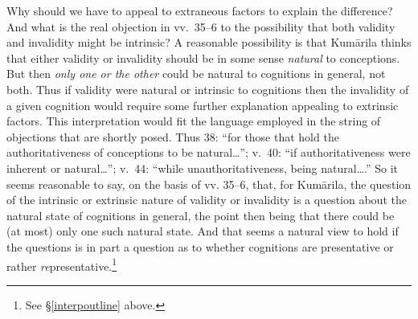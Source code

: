 ﻿\documentclass[11pt]{amsart}
\begin{document}
Why should we have to appeal to extraneous factors to explain the difference? And what is the real objection in vv.~35--6 to the possibility that both validity and invalidity might be intrinsic? A reasonable possibility is that Kum\=arila thinks that either validity or invalidity should be in some sense \emph{natural} to conceptions. But then \emph{only one or the other} could be natural to cognitions in general, not both. Thus if validity were natural or intrinsic to cognitions then the invalidity of a given cognition would require some further explanation appealing to extrinsic factors. This interpretation would fit the language employed in the string of objections that are shortly posed. Thus 38: ``for those that hold the authoritativeness of conceptions to be natural\ldots''; v.~40:  ``if authoritativeness were inherent or natural\ldots''; v.~44: ``while unauthoritativeness, being natural\ldots .'' So it seems reasonable to say, on the basis of vv. 35--6, that, for Kum\=arila, the question of the intrinsic or extrinsic nature of validity or invalidity is a question about the natural state of cognitions in general, the point then being that there could be (at most) only one such natural state. And that seems a natural view to hold if the questions is in part a question as to whether cognitions are presentative or rather \emph{re}presentative.\footnote{See \S\ref{interpoutline} above.}
\end{document}
